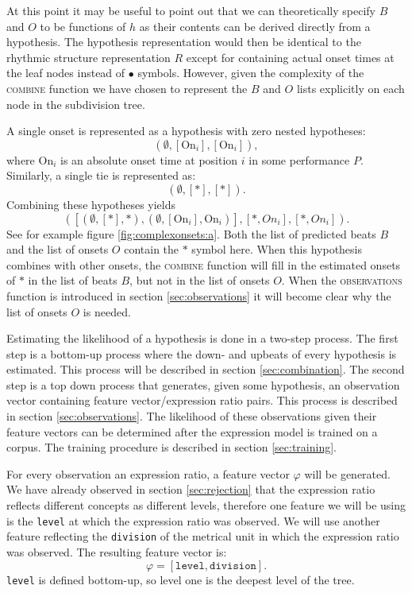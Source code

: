 At this point it may be useful to point out that we can theoretically specify $B$ and $O$ to be functions of $h$ as their contents can be derived directly from a hypothesis. The hypothesis representation would then be identical to the rhythmic structure representation $R$ except for containing actual onset times at the leaf nodes instead of $\bullet$ symbols. However, given the complexity of the \textsc{combine} function we have chosen to represent the $B$ and $O$ lists explicitly on each node in the subdivision tree.

A single onset is represented as a hypothesis with zero nested hypotheses: \[(\emptyset, [\textrm{On}_i], [\textrm{On}_i]),\] where $\textrm{On}_i$ is an absolute onset time at position $i$ in some performance $P$. Similarly, a single tie is represented as: \[(\emptyset, [*], [*]).\] Combining these hypotheses yields \[([(\emptyset, [*], *), (\emptyset, [\textrm{On}_i], \textrm{On}_i)], [*, On_i], [*, On_i]).\] See for example figure \ref{fig:complexonsets:a}. Both the list of predicted beats $B$ and the list of onsets $O$ contain the $*$ symbol here. When this hypothesis combines with other onsets, the \textsc{combine} function will fill in the estimated onsets of $*$ in the list of beats $B$, but not in the list of onsets $O$. When the \textsc{observations} function is introduced in section \ref{sec:observations} it will become clear why the list of onsets $O$ is needed.

Estimating the likelihood of a hypothesis is done in a two-step process. The first step is a bottom-up process where the down- and upbeats of every hypothesis is estimated. This process will be described in section \ref{sec:combination}. The second step is a top down process that generates, given some hypothesis, an observation vector containing feature vector/expression ratio pairs. This process is described in section \ref{sec:observations}. The likelihood of these observations given their feature vectors can be determined after the expression model is trained on a corpus. The training procedure is described in section \ref{sec:training}.

For every observation an expression ratio, a feature vector $\varphi$ will be generated. We have already observed in section \ref{sec:rejection} that the expression ratio reflects different concepts as different levels, therefore one feature we will be using is the \texttt{level} at which the expression ratio was observed. We will use another feature reflecting the \texttt{division} of the metrical unit in which the expression ratio was observed. The resulting feature vector is:
\begin{equation}
\label{eq:features}
\varphi = [\texttt{level}, \texttt{division}].
\end{equation}
\texttt{level} is defined bottom-up, so level one is the deepest level of the tree.


